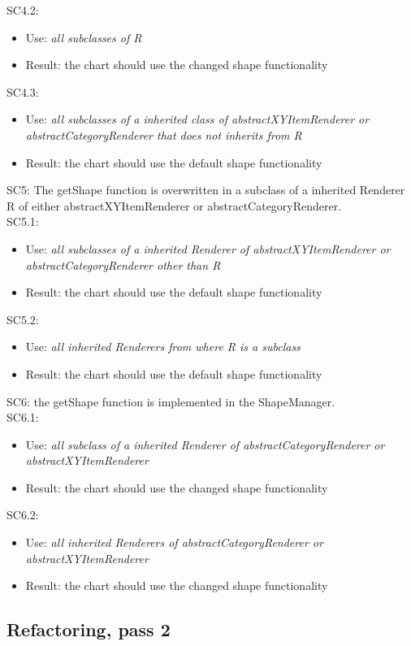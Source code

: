 \documentclass{article}
\begin{document}
SC4.2: 
\begin{itemize}
	\item Use: \textit{all subclasses of R}
	\item Result: the chart should use the changed shape functionality
\end{itemize}
SC4.3: 
\begin{itemize}
	\item Use: \textit{all subclasses of a inherited class of abstractXYItemRenderer or abstractCategoryRenderer that does not inherits from R}
	\item Result: the chart should use the default shape functionality
\end{itemize}
SC5: The getShape function is overwritten in a subclass of a inherited Renderer R of either abstractXYItemRenderer or abstractCategoryRenderer.\\
SC5.1: 
\begin{itemize}
	\item Use: \textit{all subclasses of a inherited Renderer of abstractXYItemRenderer or abstractCategoryRenderer other than R}
	\item Result: the chart should use the default shape functionality
\end{itemize}
SC5.2: 
\begin{itemize}
	\item Use: \textit{all inherited Renderers from where R is a subclass}
	\item Result: the chart should use the default shape functionality
\end{itemize}
SC6: the getShape function is implemented in the ShapeManager.\\
SC6.1: 
\begin{itemize}
	\item Use: \textit{all subclass of a inherited Renderer of abstractCategoryRenderer or abstractXYItemRenderer}
	\item Result: the chart should use the changed shape functionality
\end{itemize}
SC6.2: 
\begin{itemize}
	\item Use: \textit{all inherited Renderers of abstractCategoryRenderer or abstractXYItemRenderer}
	\item Result: the chart should use the changed shape functionality
\end{itemize}

\subsection{Refactoring, pass 2}
\end{document}

